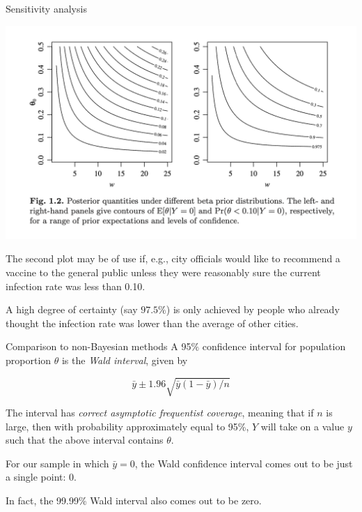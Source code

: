 \documentclass[10pt]{beamer}
\begin{document}
\begin{frame}{Sensitivity analysis}
\begin{center}
\includegraphics[width=.8\textwidth]{images/hoff_fig1dot2_sensitivity_analysis}
\end{center}

The second plot may be of use if,  e.g.,  city officials would like to recommend a vaccine to the general public unless they were reasonably sure the current infection rate was less than 0.10.  

\pause  \scriptsize
A high degree of certainty (say $97.5\%$) is only achieved by people who already thought the infection rate was lower than the average of other cities.

\end{frame}

\begin{frame}{Comparison to non-Bayesian methods}
A 95$\%$ confidence interval for population proportion $\theta$ is the \textit{Wald interval}, 
given by

\[ \bar{y} \pm 1.96 \sqrt{\bar{y} (1 - \bar{y}) / n} \]

\pause 


The interval has \textit{correct asymptotic frequentist coverage},  meaning that if $n$ is large,  then with probability approximately equal to 95\%,  $Y$ will take on a value $y$ such that the above interval contains $\theta$.

\pause 

For our sample in which $\bar{y} = 0$,  the Wald confidence interval comes out to be just a single point: 0.

\pause 

In fact,  the 99.99\% Wald interval also comes out to be zero.

\end{frame}
\end{document}
